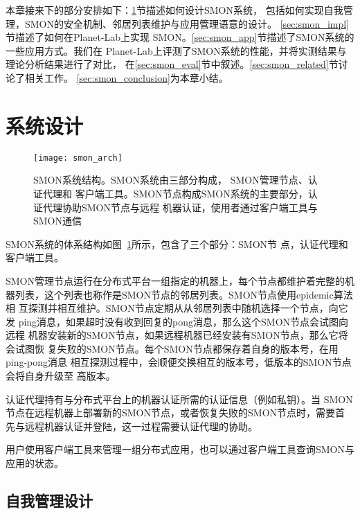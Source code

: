 
本章接来下的部分安排如下：\ref{sec:smon_design}节描述如何设计SMON系统，
包括如何实现自我管理，SMON的安全机制、邻居列表维护与应用管理语意的设计。
\ref{sec:smon_impl}节描述了如何在Planet-Lab上实现
SMON。\ref{sec:smon_app}节描述了SMON系统的一些应用方式。我们在
Planet-Lab上评测了SMON系统的性能，并将实测结果与理论分析结果进行了对比，
在\ref{sec:smon_eval}节中叙述。\ref{sec:smon_related}节讨论了相关工作。
\ref{sec:smon_conclusion}为本章小结。


\section{系统设计}
\label{sec:smon_design}

\begin{figure}
  \centering
  \begin{minipage}{0.8\linewidth}
    \centering
    \texttt{[image: smon\_arch]}
    \caption[SMON系统结构]{SMON系统结构。SMON系统由三部分构成，
    SMON管理节点、认证代理和
    客户端工具。SMON节点构成SMON系统的主要部分，认证代理协助SMON节点与远程
    机器认证，使用者通过客户端工具与SMON通信}
    \label{fig:smon_arch}
  \end{minipage}
\end{figure}

SMON系统的体系结构如图~\ref{fig:smon_arch}所示，包含了三个部分：SMON节
点，认证代理和客户端工具。

SMON管理节点运行在分布式平台一组指定的机器上，每个节点都维护着完整的机
器列表，这个列表也称作是SMON节点的邻居列表。SMON节点使用epidemic算法相
互探测并相互维护。SMON节点定期从从邻居列表中随机选择一个节点，向它发
ping消息，如果超时没有收到回复的pong消息，那么这个SMON节点会试图向远程
机器安装新的SMON节点，如果远程机器已经安装有SMON节点，那么它将会试图恢
复失败的SMON节点。每个SMON节点都保存着自身的版本号，在用ping-pong消息
相互探测过程中，会顺便交换相互的版本号，低版本的SMON节点会将自身升级至
高版本。

认证代理持有与分布式平台上的机器认证所需的认证信息（例如私钥）。当
SMON节点在远程机器上部署新的SMON节点，或者恢复失败的SMON节点时，需要首
先与远程机器认证并登陆，这一过程需要认证代理的协助。

用户使用客户端工具来管理一组分布式应用，也可以通过客户端工具查询SMON与
应用的状态。

\subsection{自我管理设计}

